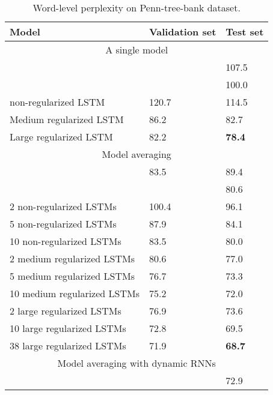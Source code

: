 \documentclass{article}
\begin{document}
\begin{table}[t]
  \small
  \centering
  \renewcommand{\arraystretch}{1.15}
  \begin{tabular}{lll}
    \hline
     Model & Validation set & Test set \\
    \hline
    \multicolumn{3}{c}{A single model} \\
    \hline
    \citet{pascanu2013construct} & & 107.5 \\
    \citet{chenglanguage} & & 100.0 \\
    non-regularized LSTM & 120.7 & 114.5 \\
    Medium regularized LSTM & 86.2 & 82.7 \\
    Large regularized LSTM & 82.2 & {\bf 78.4} \\
    \hline
    \multicolumn{3}{c}{Model averaging} \\
    \hline
    \citet{mikolov2012statistical} & 83.5 & 89.4 \\
    \citet{chenglanguage} & & 80.6 \\
    2 non-regularized LSTMs & 100.4 & 96.1 \\
    5 non-regularized LSTMs & 87.9 & 84.1 \\
    10 non-regularized LSTMs & 83.5 & 80.0 \\
    2 medium regularized LSTMs & 80.6 & 77.0 \\
    5 medium regularized LSTMs & 76.7 & 73.3 \\
    10 medium regularized LSTMs & 75.2 & 72.0 \\
    2 large regularized LSTMs & 76.9 & 73.6 \\
    10 large regularized LSTMs & 72.8 & 69.5 \\
    38 large regularized LSTMs & 71.9 & {\bf 68.7} \\
    \hline
    \multicolumn{3}{c}{Model averaging with dynamic RNNs} \\
    \hline
    \citet{mikolov2012context} & & 72.9 \\
    \hline
  \end{tabular}
  \caption{Word-level perplexity on Penn-tree-bank dataset.}
  \label{tab:ptb}
\end{table}
\end{document}
